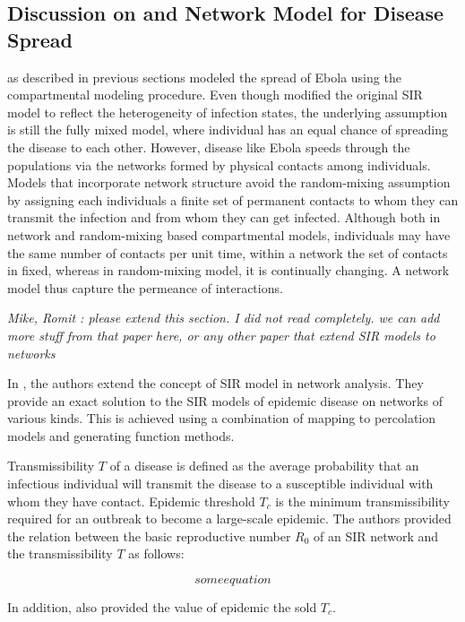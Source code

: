 \documentclass[12pt, journal,onecolumn]{IEEEtran}
\begin{document}
\subsection{Discussion on \cite{chowell2004basic, legrand2007understanding} and Network Model for Disease Spread \cite{newman2002spread}}
\cite{chowell2004basic, legrand2007understanding} as described in previous sections modeled the spread of Ebola using the compartmental modeling procedure. Even though \cite{legrand2007understanding} modified the original SIR model to reflect the heterogeneity of infection states, the underlying assumption is still the fully mixed model, where individual has an equal chance of spreading the disease to each other. However, disease like Ebola speeds through the populations via the networks formed by physical contacts among individuals. Models that incorporate network structure avoid the random-mixing assumption by assigning each individuals a finite set of permanent contacts to whom they can transmit the infection and from whom they can get infected. Although both in network and random-mixing based compartmental models, individuals may have the same number of contacts per unit time, within a network the set of contacts in fixed, whereas in random-mixing model, it is continually changing. A network model thus capture the permeance of interactions.



\bigskip 
{\em{Mike, Romit : please extend this section. I did not read \cite{newman2002spread} completely. we can add more stuff from that paper here, or any other paper that extend SIR models to networks}}

In \cite{newman2002spread}, the authors extend the concept of SIR model in network analysis.
They provide an exact solution to the SIR models of epidemic disease on networks of various kinds.
This is achieved using a combination of mapping to percolation models and generating function methods.

Transmissibility $T$ of a disease is defined as the average probability that an infectious
individual will transmit the disease to a susceptible individual with whom they have contact.
Epidemic threshold $T_c$ is the minimum transmissibility required for an outbreak to become
a large-scale epidemic. The authors provided the relation between the basic reproductive number
$R_0$ of an SIR network and the transmissibility $T$ as follows:


\[
some equation
\]

In addition, \cite{newman2002spread} also provided the value of epidemic the sold $T_c$. 
\end{document}
